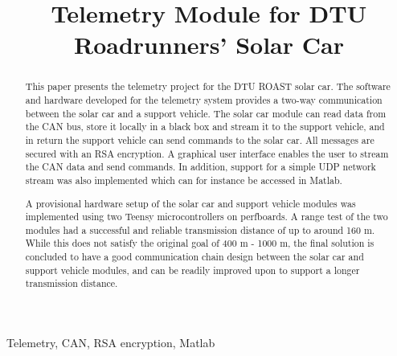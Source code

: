\documentclass[a4paper,conference]{IEEEtran}
\begin{document}
\pagestyle{default}
\title{Telemetry Module for DTU Roadrunners' Solar Car}

\author{
}

\maketitle

\begin{abstract}
This paper presents the telemetry project for the DTU ROAST solar car. The software and hardware developed for the telemetry system provides a two-way communication between the solar car and a support vehicle. The solar car module can read data from the CAN bus, store it locally in a black box and stream it to the support vehicle, and in return the support vehicle can send commands to the solar car. All messages are secured with an RSA encryption. A graphical user interface enables the user to stream the CAN data and send commands. In addition, support for a simple UDP network stream was also implemented which can for instance be accessed in Matlab.

A provisional hardware setup of the solar car and support vehicle modules was implemented using two Teensy microcontrollers on perfboards. A range test of the two modules had a successful and reliable transmission distance of up to around 160 m. While this does not satisfy the original goal of 400 m - 1000 m, the final solution is concluded to have a good communication chain design between the solar car and support vehicle modules, and can be readily improved upon to support a longer transmission distance. 
\end{abstract}

\begin{IEEEkeywords}
Telemetry, CAN, RSA encryption, Matlab
\end{IEEEkeywords}
\end{document}
